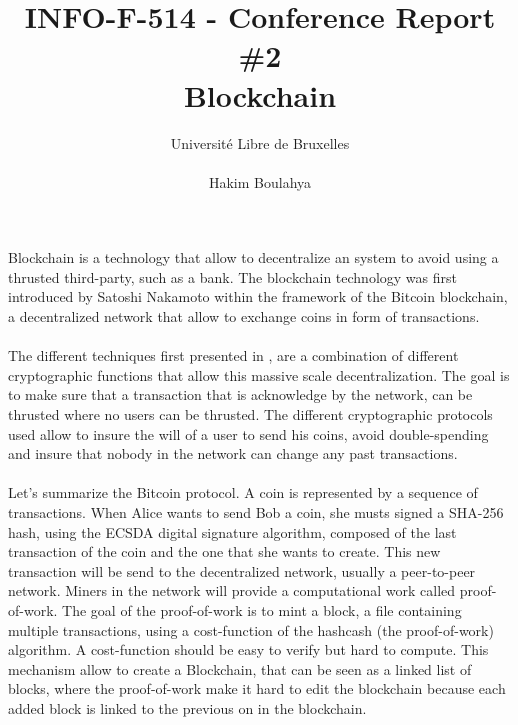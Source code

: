 \documentclass[11pt,a4paper]{article}
\title{INFO-F-514 - Conference Report \#2 \\
Blockchain}
\author{Université Libre de Bruxelles \\
\\ Hakim Boulahya}
\begin{document}
\maketitle
\newpage


\paragraph{}


Blockchain is a technology that allow to decentralize an
system to avoid using a thrusted third-party, such as a bank.
The blockchain technology was first introduced by
Satoshi Nakamoto \cite{bitcoin} within the framework
of the Bitcoin blockchain, a decentralized network
that allow to exchange coins in form of transactions.

\paragraph{}

The different techniques first presented in \cite{bitcoin}, are
a combination of different cryptographic functions that allow
this massive scale decentralization. The goal is to make
sure that a transaction that is acknowledge by the network,
can be thrusted where no users can be thrusted.
The different cryptographic protocols used allow to insure
the will of a user to send his coins, avoid double-spending and
insure that nobody in the network can change any past transactions.


\paragraph{}

Let's summarize the Bitcoin protocol. A coin is represented by
a sequence of transactions. When Alice wants to send Bob a coin,
she musts signed a SHA-256 hash, using the ECSDA digital signature
algorithm, composed of the last transaction of the coin
and the one that she wants to create. This new transaction
will be send to the decentralized network,
usually a peer-to-peer network. Miners in the network
will provide a computational work called proof-of-work.
The goal of the proof-of-work is to mint a block, a
file containing multiple transactions, using a cost-function
of the hashcash \cite{hashcash} (the proof-of-work) algorithm.
A cost-function should be easy to verify but hard to compute.
This mechanism allow to create a Blockchain, that can be seen
as a linked list of blocks, where the proof-of-work make it
hard to edit the blockchain because each added block
is linked to the previous on in the blockchain.
\end{document}
